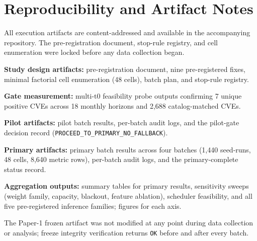 \section{Reproducibility and Artifact Notes}
All execution artifacts are content-addressed and available in the accompanying repository. The pre-registration document, stop-rule registry, and cell enumeration were locked before any data collection began.

\textbf{Study design artifacts:} pre-registration document, nine pre-registered fixes, minimal factorial cell enumeration (48 cells), batch plan, and stop-rule registry.

\textbf{Gate measurement:} multi-t0 feasibility probe outputs confirming 7 unique positive CVEs across 18 monthly horizons and 2,688 catalog-matched CVEs.

\textbf{Pilot artifacts:} pilot batch results, per-batch audit logs, and the pilot-gate decision record (\texttt{PROCEED\_TO\_PRIMARY\_NO\_FALLBACK}).

\textbf{Primary artifacts:} primary batch results across four batches (1,440 seed-runs, 48 cells, 8,640 metric rows), per-batch audit logs, and the primary-complete status record.

\textbf{Aggregation outputs:} summary tables for primary results, sensitivity sweeps (weight family, capacity, blackout, feature ablation), scheduler feasibility, and all five pre-registered inference families; figures for each axis.

The Paper-1 frozen artifact was not modified at any point during data collection or analysis; freeze integrity verification returns \texttt{OK} before and after every batch.
